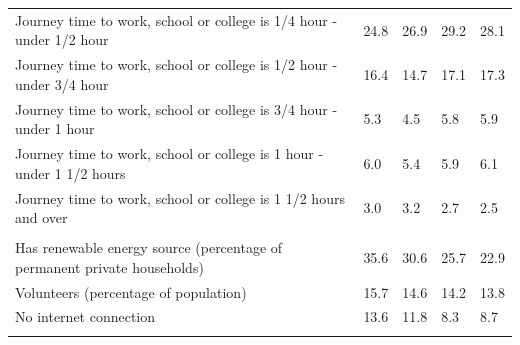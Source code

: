 \documentclass{article}
\begin{document}
\begin{table}[h]
\begin{tabular}{KTTTT}
Journey time to work, school or college is 1/4 hour - under 1/2 hour & 24.8& 26.9& 29.2& 28.1\\
Journey time to work, school or college is 1/2 hour - under 3/4 hour & 16.4& 14.7& 17.1& 17.3\\
Journey time to work, school or college is 3/4 hour - under 1 hour & 5.3& 4.5& 5.8& 5.9\\
Journey time to work, school or college is 1 hour - under 1 1/2 hours & 6.0& 5.4& 5.9& 6.1\\
Journey time to work, school or college is 1 1/2 hours and over & 3.0& 3.2& 2.7& 2.5\\
\hline
    \\ 
    \hline
Has renewable energy source (percentage of permanent private households) & 35.6& 30.6& 25.7& 22.9\\
    \hline
Volunteers (percentage of population) & 15.7& 14.6& 14.2& 13.8\\
    \hline
No internet connection& 13.6& 11.8&  8.3&  8.7\\
\hline
\end{tabular}
\end{table}
\end{document}
